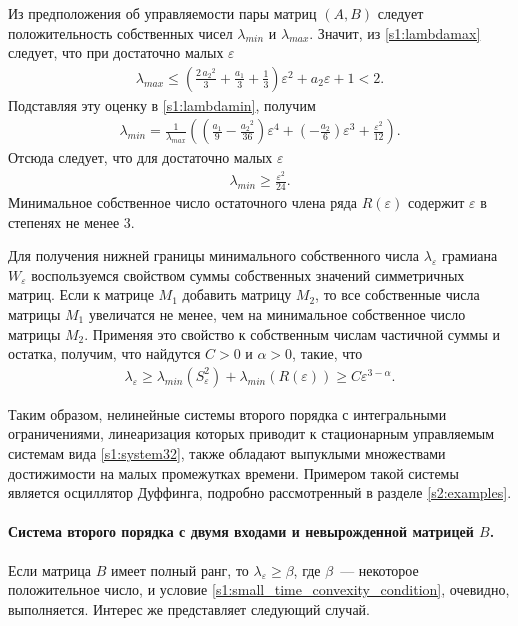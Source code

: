 \documentclass[../main.tex]{subfiles}
\begin{document}
Из предположения об управляемости пары матриц $ (A,B) $ следует положительность собственных чисел $ \lambda_{min} $ и $ \lambda_{max} $.
Значит, из \eqref{s1:lambdamax} следует, что при достаточно малых $\varepsilon$
\begin{gather*}
 \lambda_{max} \leqslant \left(\frac{2\,{a_{2}}^2}{3}+\frac{a_{1}}{3}+\frac{1}{3}\right)\varepsilon^2+a_{2}\varepsilon+1 < 2.
\end{gather*}
Подставляя эту оценку в \eqref{s1:lambdamin}, получим
\begin{gather*}
 \lambda_{min} = \frac{1}{\lambda_{max}}\left( \left(\frac{a_{1}}{9}-\frac{{a_{2}}^2}{36}\right)\varepsilon^4+\left(-\frac{a_{2}}{6}\right)\varepsilon^3+\frac{\varepsilon^2}{12}\right).
\end{gather*}
Отсюда следует, что для достаточно малых $\varepsilon$ 
\begin{gather*}
	 \lambda_{min} \geqslant \frac{\varepsilon^2}{24}.
\end{gather*} 
Минимальное собственное число остаточного члена ряда $ R(\varepsilon) $ содержит $ \varepsilon $ в степенях не менее 3.
 
Для получения нижней границы минимального собственного числа $ \lambda_{\varepsilon} $ грамиана $ W_{\varepsilon}$ воспользуемся свойством суммы собственных значений симметричных матриц\cite{Wilkinson}.
Если к матрице $ M_1 $ добавить матрицу $ M_2 $, то все собственные числа матрицы $ M_1 $ увеличатся не менее, чем на минимальное собственное число матрицы $ M_2 $.
Применяя это свойство к собственным числам частичной суммы и остатка, получим, что найдутся $C > 0$ и $\alpha > 0 $, такие, что
\begin{gather*}
 \lambda_{\varepsilon} \geqslant \lambda_{min}(S_{\varepsilon}^{2}) + \lambda_{min}(R(\varepsilon)) \geqslant C \varepsilon^{3-\alpha}.
\end{gather*}
 
Таким образом, нелинейные системы второго порядка с интегральными ограничениями, линеаризация которых приводит к стационарным управляемым системам вида \eqref{s1:system32}, также обладают выпуклыми множествами достижимости на малых промежутках времени.
Примером такой системы является осциллятор Дуффинга, подробно рассмотренный в разделе \ref{s2:examples}.

\paragraph{Система второго порядка с двумя входами и невырожденной матрицей $B$.}
Если матрица $ B $ имеет полный ранг, то $\lambda_{\varepsilon} \geqslant \beta $, где $ \beta $~--- некоторое положительное число, и условие \eqref{s1:small_time_convexity_condition}, очевидно, выполняется.
Интерес же представляет следующий случай.
\end{document}
